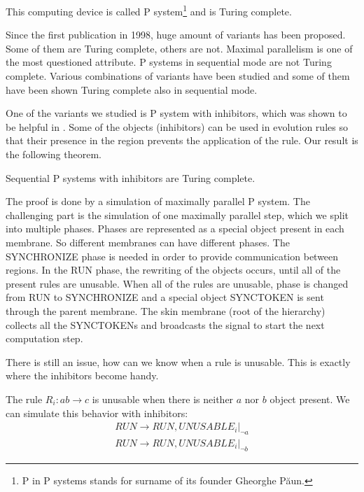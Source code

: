 \documentclass{svk_short_en}
\begin{document}
This computing device is called P system\footnote{P in P systems stands for surname of its founder Gheorghe P\u aun.} and is Turing complete.

Since the first publication in 1998, huge amount of variants has been proposed. Some of them are Turing complete, others are not. Maximal parallelism is one of the most questioned attribute. P systems in sequential mode are not Turing complete. Various combinations of variants have been studied and some of them have been shown Turing complete also in sequential mode.

One of the variants we studied is P system with inhibitors, which was shown to be helpful in \cite{Ionescu_sburlan:on}. Some of the objects (inhibitors) can be used in evolution rules so that their presence in the region prevents the application of the rule. Our result is the following theorem.

\begin{theorem}
\label{th:prop}
Sequential P systems with inhibitors are Turing complete.
\end{theorem}

The proof is done by a simulation of maximally parallel P system. The challenging part is the simulation of one maximally parallel step, which we split into  multiple phases. Phases are represented as a special object present in each membrane. So different membranes can have different phases.
The SYNCHRONIZE phase is needed in order to provide communication between regions.
In the RUN phase, the rewriting of the objects occurs, until all of the present rules are unusable. When all of the rules are unusable, phase is changed from RUN to SYNCHRONIZE and a special object SYNCTOKEN is sent through the parent membrane. The skin membrane (root of the hierarchy) collects all the SYNCTOKENs and broadcasts the signal to start the next computation step.

There is still an issue, how can we know when a rule is unusable. This is exactly where the inhibitors become handy.

The rule $R_i: ab \rightarrow c$ is unusable when there is neither $a$ nor $b$ object present. We can simulate this behavior with inhibitors:
\begin{align*}
  RUN \rightarrow RUN, UNUSABLE_i |_{\neg a}
  \\
  RUN \rightarrow RUN, UNUSABLE_i |_{\neg b}
\end{align*}




\end{document}
